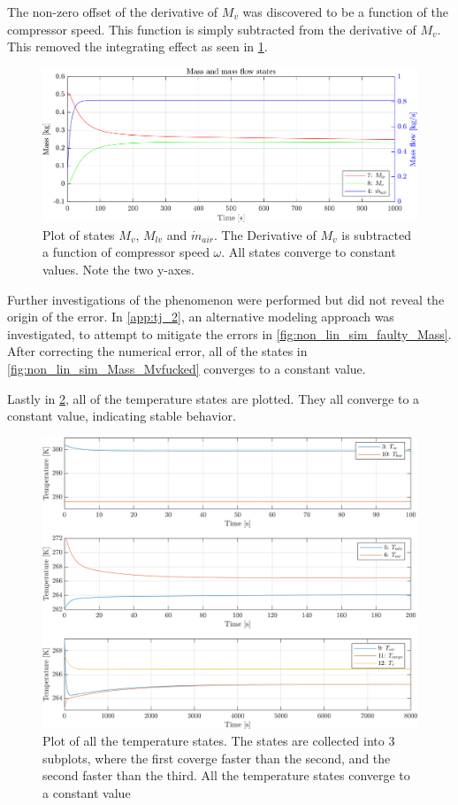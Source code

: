 The non-zero offset of the derivative of $ M_v $ was discovered to be a function of the compressor speed. This function is simply subtracted from the derivative of $M_v$. This removed the integrating effect as seen in \cref{fig:non_lin_sim_Mass}.

\begin{figure}[h]
	\centering
	\includegraphics[width=1\textwidth]{Graphics/nonlin_sim_Mass.png}
	\caption{Plot of states $ M_v $, $ M_{lv} $ and $ \dot{m}_{air} $. The Derivative of $ M_v $ is subtracted a function of compressor speed $ \omega $. All states converge to constant values. Note the two y-axes.}
	\label{fig:non_lin_sim_Mass}
\end{figure}

\newpage
Further investigations of the phenomenon were performed but did not reveal the origin of the error. In \cref{app:tj_2}, an alternative modeling approach was investigated, to attempt to mitigate the errors in \cref{fig:non_lin_sim_faulty_Mass}. After correcting the numerical error, all of the states in \cref{fig:non_lin_sim_Mass_Mvfucked} converges to a constant value.

Lastly in \cref{fig:non_lin_sim_Temperature}, all of the temperature states are plotted. They all converge to a constant value, indicating stable behavior.

\begin{figure}[h]
	\centering
	\includegraphics[width=1\textwidth]{Graphics/nonlin_sim_Temperature.png}
	\caption{Plot of all the temperature states. The states are collected into 3 subplots, where the first coverge faster than the second, and the second faster than the third. All the temperature states converge to a constant value}
	\label{fig:non_lin_sim_Temperature}
\end{figure}

